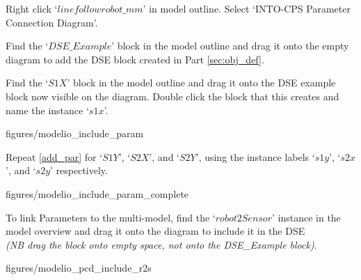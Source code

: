 \documentclass[11pt,a4paper]{../tutorial}
\begin{document}
\begin{instructions}

\item Right click `$linefollowrobot\_mm$' in model outline. Select `INTO-CPS \menusep Parameter Connection Diagram'.

\item Find the `$DSE\_Example$' block in the model outline and drag it onto the empty diagram to add the DSE block created in Part \ref{sec:obj_def}.

\item \label{add_par} Find the `$S1X$' block in the model outline and drag it onto the DSE example block now visible on the diagram. Double click the block that this creates and name the instance `$s1x$'.

\begin{center}
\begin{annotation}[width=0.7\linewidth]{figures/modelio_include_param}
    \end{annotation}
\end{center}

\newpage

\item Repeat \ref{add_par} for `$S1Y$', `$S2X$', and `$S2Y$', using the instance labels `$s1y$', `$s2x$', and `$s2y$' respectively.

\begin{center}
\begin{annotation}[width=0.7\linewidth]{figures/modelio_include_param_complete}
    \end{annotation}
\end{center}


\item To link Parameters to the multi-model, find the `$robot2Sensor$' instance in the model overview and drag it onto the diagram to include it in the DSE \\ \textit{(NB drag the block onto empty space, not onto the DSE\_Example block)}.

\begin{center}
\begin{annotation}[width=0.7\linewidth]{figures/modelio_pcd_include_r2s}
    \end{annotation}
\end{center}


\end{instructions}
\end{document}
